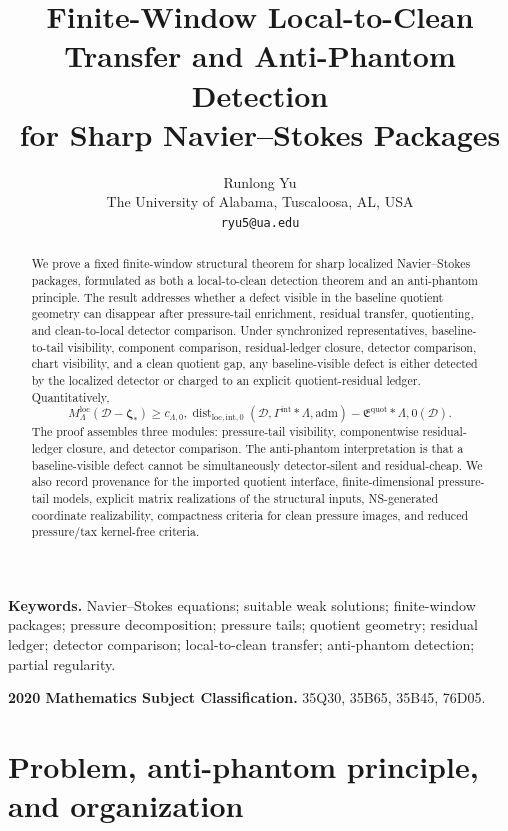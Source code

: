 \documentclass[11pt]{article}
\title{\textbf{Finite-Window Local-to-Clean Transfer and Anti-Phantom Detection\\
for Sharp Navier--Stokes Packages}}
\author{Runlong Yu\\
The University of Alabama, Tuscaloosa, AL, USA\\
\texttt{ryu5@ua.edu}}
\date{}
\numberwithin{equation}{section}
\theoremstyle{definition}
\theoremstyle{remark}
\newcommand{\loc}{\mathrm{loc}}
\newcommand{\intg}{\mathrm{int}}
\newcommand{\adm}{\mathrm{adm}}
\newcommand{\quot}{\mathrm{quot}}
\newcommand{\Dist}{\operatorname{dist}}
\newcommand{\calD}{\mathcal D}
\newcommand{\bzeta}{\boldsymbol\zeta}
\begin{document}
\maketitle

\begin{abstract}
We prove a fixed finite-window structural theorem for sharp localized Navier--Stokes packages, formulated as both a local-to-clean detection theorem and an anti-phantom principle.  The result addresses whether a defect visible in the baseline quotient geometry can disappear after pressure-tail enrichment, residual transfer, quotienting, and clean-to-local detector comparison.  Under synchronized representatives, baseline-to-tail visibility, component comparison, residual-ledger closure, detector comparison, chart visibility, and a clean quotient gap, any baseline-visible defect is either detected by the localized detector or charged to an explicit quotient-residual ledger.  Quantitatively,
\[
M_\Lambda^{\loc}(\calD-\bzeta_*)
\ge
c_{\Lambda,0},
\Dist_{\loc,\intg,0}(\calD,\Gamma^{\intg}*{\Lambda,\adm})
-
\mathfrak E^{\quot}*{\Lambda,0}(\calD).
\]
The proof assembles three modules: pressure-tail visibility, componentwise residual-ledger closure, and detector comparison.  The anti-phantom interpretation is that a baseline-visible defect cannot be simultaneously detector-silent and residual-cheap.  We also record provenance for the imported quotient interface, finite-dimensional pressure-tail models, explicit matrix realizations of the structural inputs, NS-generated coordinate realizability, compactness criteria for clean pressure images, and reduced pressure/tax kernel-free criteria.

\end{abstract}

\noindent\textbf{Keywords.}
Navier--Stokes equations; suitable weak solutions; finite-window packages; pressure decomposition; pressure tails; quotient geometry; residual ledger; detector comparison; local-to-clean transfer; anti-phantom detection; partial regularity.

\medskip
\noindent\textbf{2020 Mathematics Subject Classification.}
35Q30, 35B65, 35B45, 76D05.

\setcounter{tocdepth}{1}
\tableofcontents

\section{Problem, anti-phantom principle, and organization}\label{sec:intro-problem}
\end{document}
